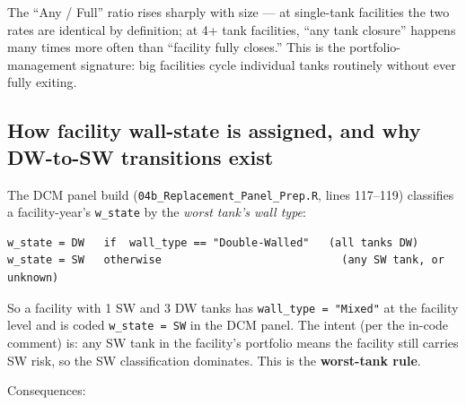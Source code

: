 \documentclass[
  11pt,
]{article}
\begin{document}
The ``Any / Full'' ratio rises sharply with size --- at single-tank
facilities the two rates are identical by definition; at 4+ tank
facilities, ``any tank closure'' happens many times more often than
``facility fully closes.'' This is the portfolio-management signature:
big facilities cycle individual tanks routinely without ever fully
exiting.

\subsection{How facility wall-state is assigned, and why DW-to-SW
transitions exist}\label{sec-wall-state-rule}

The DCM panel build (\texttt{04b\_Replacement\_Panel\_Prep.R}, lines
117--119) classifies a facility-year's \texttt{w\_state} by the
\emph{worst tank's wall type}:

\begin{verbatim}
w_state = DW   if  wall_type == "Double-Walled"   (all tanks DW)
w_state = SW   otherwise                            (any SW tank, or unknown)
\end{verbatim}

So a facility with 1 SW and 3 DW tanks has
\texttt{wall\_type\ =\ "Mixed"} at the facility level and is coded
\texttt{w\_state\ =\ SW} in the DCM panel. The intent (per the in-code
comment) is: any SW tank in the facility's portfolio means the facility
still carries SW risk, so the SW classification dominates. This is the
\textbf{worst-tank rule}.

Consequences:
\end{document}

